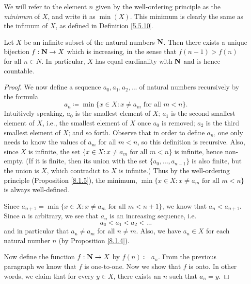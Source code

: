 \begin{note}
    We will refer to the element \(n\) given by the well-ordering principle as the \emph{minimum} of \(X\), and write it as \(\min(X)\).
    This minimum is clearly the same as the infimum of \(X\), as defined in Definition \ref{5.5.10}.
\end{note}

\begin{proposition}\label{8.1.5}
    Let \(X\) be an infinite subset of the natural numbers \(\mathbf{N}\).
    Then there exists a unique bijection \(f : \mathbf{N} \to X\) which is increasing, in the sense that \(f(n + 1) > f(n)\) for all \(n \in N\).
    In particular, \(X\) has equal cardinality with \(\mathbf{N}\) and is hence countable.
\end{proposition}

\begin{proof}
    We now define a sequence \(a_0, a_1, a_2, \dots\) of natural numbers recursively by the formula
    \[
        a_n \coloneqq \min\{x \in X : x \neq a_m \text{ for all } m < n\}.
    \]
    Intuitively speaking, \(a_0\) is the smallest element of \(X\);
    \(a_1\) is the second smallest element of \(X\), i.e., the smallest element of \(X\) once \(a_0\) is removed;
    \(a_2\) is the third smallest element of \(X\);
    and so forth.
    Observe that in order to define \(a_n\), one only needs to know the values of \(a_m\) for all \(m < n\), so this definition is recursive.
    Also, since \(X\) is infinite, the set \(\{x \in X : x \neq a_m \text{ for all } m < n\}\) is infinite, hence non-empty.
    (If it is finite, then its union with the set \(\{a_0, \dots, a_{n - 1}\}\) is also finite, but the union is \(X\), which contradict to \(X\) is infinite.)
    Thus by the well-ordering principle (Proposition \ref{8.1.5}), the minimum, \(\min\{x \in X : x \neq a_m \text{ for all } m < n\}\) is always well-defined.

    Since \(a_{n + 1} = \min\{x \in X : x \neq a_m \text{ for all } m < n + 1\}\), we know that \(a_n < a_{n + 1}\).
    Since \(n\) is arbitrary, we see that \(a_n\) is an increasing sequence, i.e.
    \[
        a_0 < a_1 < a_2 < \dots
    \]
    and in particular that \(a_n \neq a_m\) for all \(n \neq m\).
    Also, we have \(a_n \in X\) for each natural number \(n\) (by Proposition \ref{8.1.4}).

    Now define the function \(f : \mathbf{N} \to X\) by \(f(n) \coloneqq a_n\).
    From the previous paragraph we know that \(f\) is one-to-one.
    Now we show that \(f\) is onto.
    In other words, we claim that for every \(y \in X\), there exists an \(n\) such that \(a_n = y\).


\end{proof}
